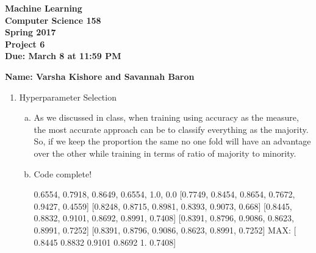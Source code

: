 \documentclass[11pt]{article}
\begin{document}
\newcommand{\Name}[1]{\noindent \textbf{Name:} #1 \\}
\newcommand{\pderiv}[2]{\frac{\partial #1}{\partial #2}}
\newcommand{\psderiv}[3]{\frac{\partial^2 #1}{\partial #2 \partial #3}}

\begin{center}
	\bf
	Machine Learning \\
	Computer Science 158 \\
	Spring 2017 \\
	\rm
	Project 6\\
	Due: March 8 at 11:59 PM \\
\end{center}
\noindent \textbf{Name: Varsha Kishore and Savannah Baron} \\
\begin{enumerate}[(2)]
\item Hyperparameter Selection
\begin{enumerate}[(b)]
\item As we discussed in class, when training using accuracy as the measure, 
the most accurate approach can be to classify everything as the majority. So, if we 
keep the proportion the same no one fold will have an advantage over the other while
training in terms of ratio of majority to minority. 
\item Code complete!
\item 
[0.6554, 0.7918, 0.8649, 0.6554, 1.0, 0.0]
[0.7749, 0.8454, 0.8654, 0.7672, 0.9427, 0.4559]
[0.8248, 0.8715, 0.8981, 0.8393, 0.9073, 0.668]
[0.8445, 0.8832, 0.9101, 0.8692, 0.8991, 0.7408]
[0.8391, 0.8796, 0.9086, 0.8623, 0.8991, 0.7252]
[0.8391, 0.8796, 0.9086, 0.8623, 0.8991, 0.7252]
MAX: [ 0.8445  0.8832  0.9101  0.8692  1.      0.7408]
\end{enumerate}
\end{enumerate}
\end{document}
